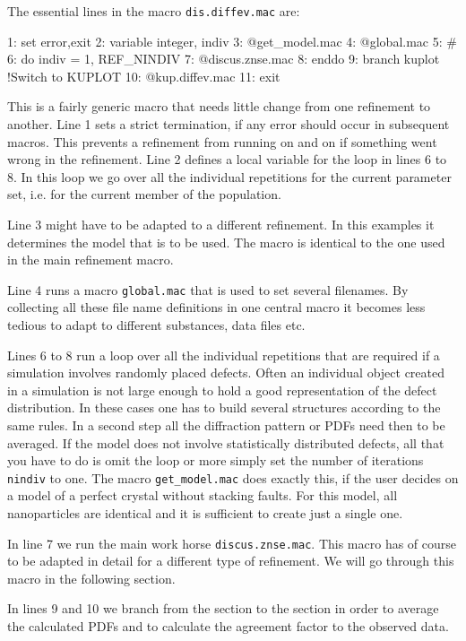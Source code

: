 The essential lines in the macro {\tt dis.diffev.mac} are:
\begin{MacVerbatim}
 1: set error,exit
 2: variable integer, indiv
 3: @get_model.mac
 4: @global.mac
 5: #
 6: do indiv = 1, REF_NINDIV
 7:   @discus.znse.mac
 8: enddo
 9: branch   kuplot    !Switch to KUPLOT
10:    @kup.diffev.mac
11: exit
\end{MacVerbatim}

This is a fairly generic macro that needs little change from one refinement to
another. Line 1 sets a strict termination, if any error should occur in subsequent
macros. This prevents a refinement from running on and on if something went wrong
in the refinement. Line 2 defines a local variable for the loop in lines 6 to 8.
In this loop we go over all the individual repetitions for the current parameter 
set, i.e. for the current member of the population. 

Line 3 might have to be adapted to a different refinement. In this examples it
determines the model that is to be used. The macro is identical to the one used 
in the main refinement macro. 

Line 4 runs a macro {\tt global.mac} that is used to set several filenames. By
collecting all these file name definitions in one central macro it becomes less
tedious to adapt to different substances, data files etc.

Lines 6 to 8 run a loop over all the individual repetitions that are required if
a simulation involves randomly placed defects. Often an individual object created
in a simulation is not large enough to hold a good representation of the defect
distribution. In these cases one has to build several structures according to 
the same rules. In a second step all the diffraction pattern or PDFs need then 
to be averaged. If the model does not involve statistically distributed defects,
all that you have to do is omit the loop or more simply set the number of 
iterations {\tt nindiv} to one. The macro {\tt get\_model.mac} does exactly this, if
the user decides on a model of a perfect crystal without stacking faults. For
this model, all nanoparticles are identical and it is sufficient to create just 
a single one.

In line 7 we run the main work horse {\tt discus.znse.mac}. This macro has of 
course to be adapted in detail for a different type of refinement. We will go
through this macro in the following section.

In lines 9 and 10 we branch from the \Discus section to the \Kuplot section
in order to average the calculated PDFs and to calculate the agreement factor
to the observed data.

